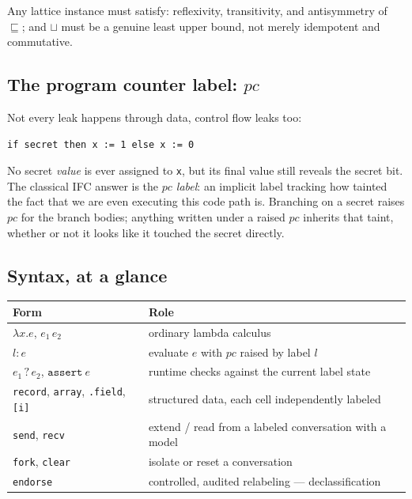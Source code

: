\documentclass[11pt, a4paper]{article}
\newcommand{\flowsto}{\sqsubseteq}
\newcommand{\joinop}{\sqcup}
\begin{document}
\begin{descirption}
{Any lattice instance must satisfy: reflexivity, transitivity, and
antisymmetry of $\flowsto$; and $\joinop$ must be a genuine least upper
bound, not merely idempotent and commutative.

\subsection{The program counter label: \texorpdfstring{$pc$}{pc}}

Not every leak happens through data, control flow leaks too:

\begin{lstlisting}
if secret then x := 1 else x := 0
\end{lstlisting}

No secret \emph{value} is ever assigned to \texttt{x}, but its final value
still reveals the secret bit. The classical IFC answer is the \emph{$pc$
label}: an implicit label tracking how tainted the fact that we are even
executing this code path is. Branching on a secret raises $pc$ for the
branch bodies; anything written under a raised $pc$ inherits that taint,
whether or not it looks like it touched the secret directly.

\subsection{Syntax, at a glance}

\begin{center}
\begin{tabular}{@{}ll@{}}
\toprule
Form & Role \\
\midrule
$\lambda x.e$, $e_1\,e_2$ & ordinary lambda calculus \\
$l : e$ & evaluate $e$ with $pc$ raised by label $l$ \\
$e_1 \mathbin{?} e_2$, $\mathtt{assert}\ e$ & runtime checks against the current label state \\
\texttt{record}, \texttt{array}, \texttt{.field}, \texttt{[i]} & structured data, each cell independently labeled \\
\texttt{send}, \texttt{recv} & extend / read from a labeled conversation with a model \\
\texttt{fork}, \texttt{clear} & isolate or reset a conversation \\
\texttt{endorse} & controlled, audited relabeling --- declassification \\
\bottomrule
\end{tabular}
\end{center}

}
\end{descirption}
\end{document}
